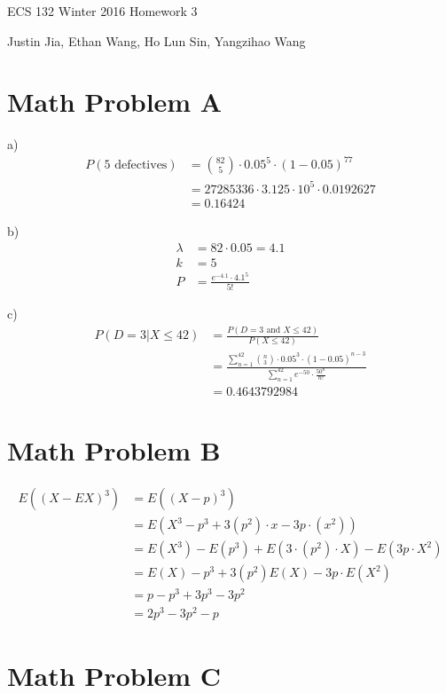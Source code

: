 \documentclass[11pt]{article}
\begin{document}
ECS 132 Winter 2016 Homework 3

Justin Jia, Ethan Wang, Ho Lun Sin, Yangzihao Wang

\section{Math Problem A}

a)
\begin{align*}
P(\text{5 defectives}) &= \binom{82}{5} \cdot 0.05^5 \cdot (1-0.05)^{77}\\
					   &= 27285336 \cdot 3.125 \cdot 10^5 \cdot 0.0192627\\
					   &= 0.16424
\end{align*}

b)
\begin{align*}
\lambda &= 82 \cdot 0.05 = 4.1\\
k &= 5\\
P &= \frac{e^{-4.1} \cdot 4.1^5}{5!}
\end{align*}

c)
\begin{align*}
P(D = 3 | X \leq 42) &= \frac{P(D = 3 \text{ and } X \leq 42)}{P(X\leq42)}\\
				&= \frac{\sum_{n=1}^{42} \binom{n}{3} \cdot 0.05^3 \cdot (1-0.05)^{n-3}}{\sum_{n=1}^{42} e^{-50} \cdot \frac{50^n}{n!}}\\
					 &= 0.4643792984
\end{align*}


\section{Math Problem B}

\begin{align*}
E((X - EX)^3) &= E((X-p)^3)\\
			  &= E(X^3 - p^3 + 3(p^2) \cdot x - 3p \cdot (x^2))\\
			  &= E(X^3) - E(p^3) + E(3\cdot(p^2)\cdot X) - E(3p\cdot X^2)\\
			  &= E(X) - p^3 + 3(p^2)E(X) - 3p\cdot E(X^2)\\
			  &= p - p^3 + 3p^3 - 3p^2\\
			  &= 2p^3 - 3p^2 - p 
\end{align*}

\section{Math Problem C}
\end{document}
